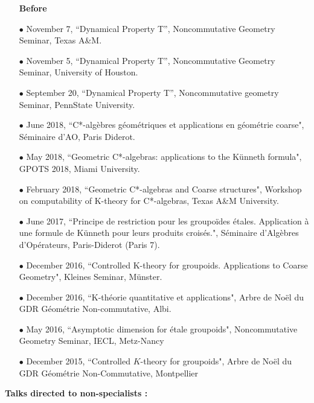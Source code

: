 \documentclass[a4paper,11pt]{article}
\newcommand\espace{\vrule height 20pt width 0pt}
\begin{document}
\begin{itemize}
\item[\textbf{Before}]
\item[$\bullet$] November 7, ``Dynamical Property T'', Noncommutative Geometry Seminar, Texas A\&M.
\item[$\bullet$] November 5, ``Dynamical Property T'', Noncommutative Geometry Seminar, University of Houston.
\item[$\bullet$] September 20, ``Dynamical Property T'', Noncommutative geometry Seminar, PennState University.
\item[$\bullet$] June 2018, ``C*-alg\`ebres g\'eom\'etriques et applications en g\'eom\'etrie coarse", S\'eminaire d'AO, Paris Diderot.
\item[$\bullet$] May 2018, ``Geometric C*-algebras: applications to the K\"unneth formula", GPOTS 2018, Miami University.
\item[$\bullet$] February 2018, ``Geometric C*-algebras and Coarse structures", Workshop on computability of K-theory for C*-algebras, Texas A\&M University.
\item[$\bullet$] June 2017, ``Principe de restriction pour les groupoïdes étales. Application à une formule de Künneth pour leurs produits croisés.", Séminaire d'Algèbres d'Opérateurs, Paris-Diderot (Paris 7).
\item[$\bullet$] December 2016, ``Controlled K-theory for groupoids. Applications to Coarse Geometry", Kleines Seminar, Münster.
\item[$\bullet$] December 2016, ``K-théorie quantitative et applications", Arbre de Noël du GDR Géométrie Non-commutative, Albi.
\item[$\bullet$] May 2016, ``Asymptotic dimension for étale groupoids", Noncommutative Geometry Seminar, IECL, Metz-Nancy
\item[$\bullet$] December 2015, ``Controlled $K$-theory for groupoids", Arbre de Noël du GDR Géométrie Non-Commutative, Montpellier
\end{itemize}
\espace

\textbf{Talks directed to non-specialists :}\\
\end{document}
